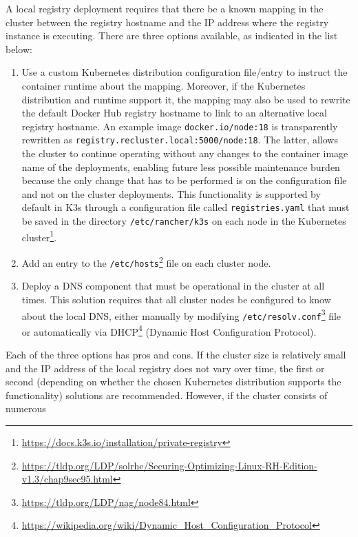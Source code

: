 A local registry deployment requires that there be a known mapping in the
cluster between the registry hostname and the IP address where the registry
instance is executing. There are three options available, as indicated in the
list below:
\begin{enumerate}
  \item Use a custom Kubernetes distribution configuration file/entry to instruct
    the container runtime about the mapping. Moreover, if the Kubernetes distribution
    and runtime support it, the mapping may also be used to rewrite the default
    Docker Hub registry hostname to link to an alternative local registry
    hostname. An example image \texttt{docker.io/node:18} is transparently
    rewritten as \texttt{registry.recluster.local:5000/node:18}. The latter, allows
    the cluster to continue operating without any changes to the container image
    name of the deployments, enabling future less possible maintenance burden
    because the only change that has to be performed is on the configuration
    file and not on the cluster deployments.
    \newline
    This functionality is supported by default in K3s through a configuration file
    called \texttt{registries.yaml} that must be saved in the directory \texttt{/etc/rancher/k3s}
    on each node in the Kubernetes cluster\footnote{\url{https://docs.k3s.io/installation/private-registry}}.

  \item Add an entry to the \texttt{/etc/hosts}\footnote{\url{https://tldp.org/LDP/solrhe/Securing-Optimizing-Linux-RH-Edition-v1.3/chap9sec95.html}}
    file on each cluster node.

  \item Deploy a DNS component that must be operational in the cluster at all times.
    \newline
    This solution requires that all cluster nodes be configured to know about
    the local DNS, either manually by modifying \texttt{/etc/resolv.conf}\footnote{\url{https://tldp.org/LDP/nag/node84.html}}
    file or automatically via DHCP\footnote{\url{https://wikipedia.org/wiki/Dynamic_Host_Configuration_Protocol}}
    (Dynamic Host Configuration Protocol).
\end{enumerate}
Each of the three options has pros and cons. If the cluster size is relatively
small and the IP address of the local registry does not vary over time, the first
or second (depending on whether the chosen Kubernetes distribution supports the
functionality) solutions are recommended. However, if the cluster consists of numerous
